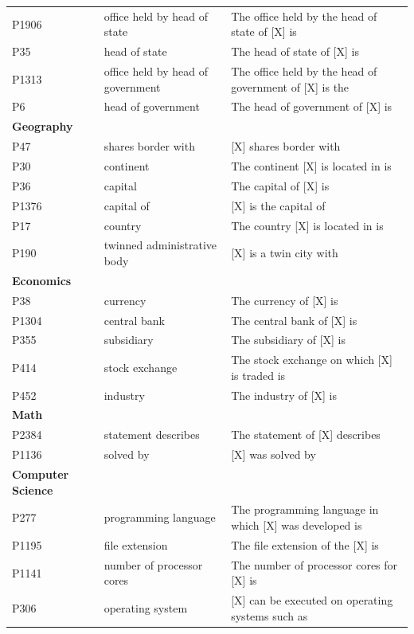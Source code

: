 \begin{table}[!ht]
{\begin{tabular}{l|l|l}
        P1906 & office held by head of state & The office held by the head of state of [X] is \\ 
        P35 & head of state & The head of state of [X] is \\ 
        P1313 & office held by head of government  & The office held by the head of government of [X] is the \\ 
        P6 & head of government & The head of government of [X] is \\ \midrule
        \textbf{Geography} & ~ & ~ \\ 
        P47 & shares border with & [X] shares border with \\ 
        P30 & continent & The continent [X] is located in is \\ 
        P36 & capital & The capital of [X] is \\ 
        P1376 & capital of & [X] is the capital of \\ 
        P17 & country & The country [X] is located in is \\ 
        P190 & twinned administrative body & [X] is a twin city with \\ \midrule
        \textbf{Economics} & ~ & ~ \\ 
        P38 & currency & The currency of [X] is \\ 
        P1304 & central bank & The central bank of [X] is \\ 
        P355 & subsidiary & The subsidiary of [X] is \\ 
        P414 & stock exchange & The stock exchange on which [X] is traded is \\ 
        P452 & industry & The industry of [X] is \\ \midrule
        \textbf{Math} & ~ & ~ \\ 
        P2384 & statement describes & The statement of [X] describes \\ 
        P1136 & solved by & [X] was solved by \\ \midrule
        \textbf{Computer Science} & ~ & ~ \\ 
        P277 & programming language & The programming language in which [X] was developed is \\ 
        P1195 & file extension & The file extension of the [X] is \\ 
        P1141 & number of processor cores & The number of processor cores for [X] is \\ 
        P306 & operating system & [X] can be executed on operating systems such as \\ \midrule

\end{tabular}}
\end{table}

